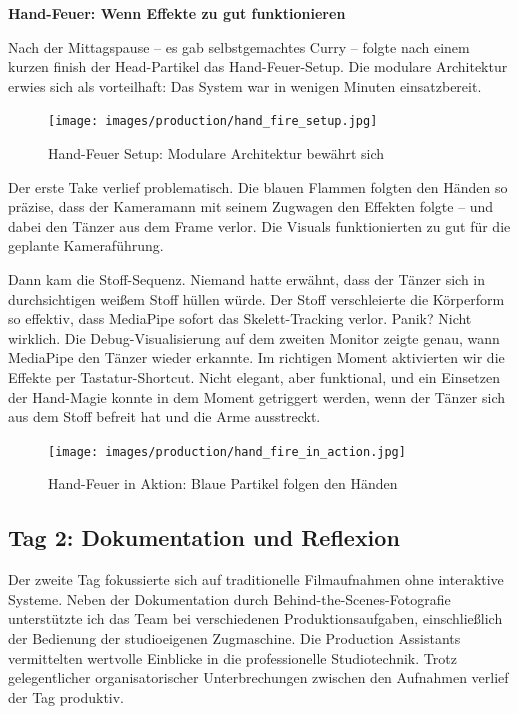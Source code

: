 \textbf{Hand-Feuer: Wenn Effekte zu gut funktionieren}

Nach der Mittagspause – es gab selbstgemachtes Curry – folgte nach einem kurzen finish der Head-Partikel das Hand-Feuer-Setup. Die modulare Architektur erwies sich als vorteilhaft: Das System war in wenigen Minuten einsatzbereit.

\begin{figure}[h]
   \centering
   \texttt{[image: images/production/hand\_fire\_setup.jpg]}
   \caption{Hand-Feuer Setup: Modulare Architektur bewährt sich}
   \label{fig:hand_fire_setup}
\end{figure}

Der erste Take verlief problematisch. Die blauen Flammen folgten den Händen so präzise, dass der Kameramann mit seinem Zugwagen den Effekten folgte – und dabei den Tänzer aus dem Frame verlor. Die Visuals funktionierten zu gut für die geplante Kameraführung.

Dann kam die Stoff-Sequenz. Niemand hatte erwähnt, dass der Tänzer sich in durchsichtigen weißem Stoff hüllen würde. Der Stoff verschleierte die Körperform so effektiv, dass MediaPipe sofort das Skelett-Tracking verlor. Panik? Nicht wirklich. Die Debug-Visualisierung auf dem zweiten Monitor zeigte genau, wann MediaPipe den Tänzer wieder erkannte. Im richtigen Moment aktivierten wir die Effekte per Tastatur-Shortcut. Nicht elegant, aber funktional, und ein Einsetzen der Hand-Magie konnte in dem Moment getriggert werden, wenn der Tänzer sich aus dem Stoff befreit hat und die Arme ausstreckt.

\begin{figure}[h]
   \centering
   \texttt{[image: images/production/hand\_fire\_in\_action.jpg]}
   \caption{Hand-Feuer in Aktion: Blaue Partikel folgen den Händen}
   \label{fig:hand_fire_action}
\end{figure}

\subsection{Tag 2: Dokumentation und Reflexion}

Der zweite Tag fokussierte sich auf traditionelle Filmaufnahmen ohne interaktive Systeme. Neben der Dokumentation durch Behind-the-Scenes-Fotografie unterstützte ich das Team bei verschiedenen Produktionsaufgaben, einschließlich der Bedienung der studioeigenen Zugmaschine. Die Production Assistants vermittelten wertvolle Einblicke in die professionelle Studiotechnik. Trotz gelegentlicher organisatorischer Unterbrechungen zwischen den Aufnahmen verlief der Tag produktiv.

